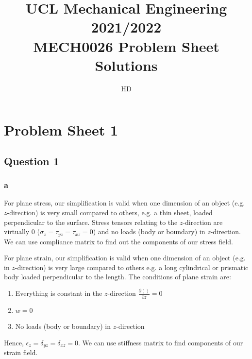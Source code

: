 \documentclass[11pt]{article}
\numberwithin{equation}{section}
\begin{document}
\title{\textbf{UCL Mechanical Engineering 2021/2022}\\MECH0026 Problem Sheet Solutions}
\author{HD}
\maketitle
\section{Problem Sheet 1}
\subsection{Question 1}
\subsubsection{a}
For plane stress, our simplification is valid when one dimension of an object (e.g. $z$-direction) is very small compared to others, e.g. a thin sheet, loaded perpendicular to the surface. Stress tensors relating to the $z$-direction are virtually 0 ($\sigma_z = \tau_{yz} = \tau_{xz} =0$) and no loads (body or boundary) in $z$-direction. We can use compliance matrix to find out the components of our stress field.

For plane strain, our simplification is valid when one dimension of an object (e.g. in $z$-direction) is very large compared to others e.g. a long cylindrical or prismatic body loaded perpendicular to the length. The conditions of plane strain are:
\begin{enumerate}
    \item Everything is constant in the $z$-direction $\frac{\partial ()}{\partial z} = 0$
    \item $w = 0$
    \item No loads (body or boundary) in $z$-direction
\end{enumerate}
Hence, $\epsilon_z = \delta_{yz} = \delta_{xz} =0$. We can use stiffness matrix to find components of our strain field.
\end{document}

